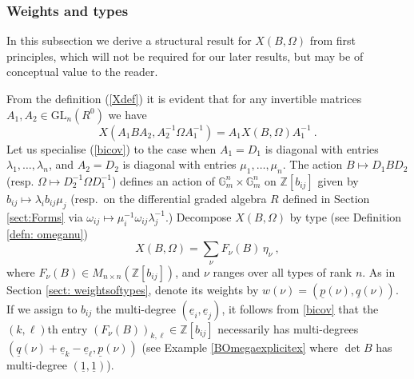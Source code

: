 \documentclass[10pt]{amsart}
\newcommand{\ZZ}{{\mathbb Z}}
\newcommand{\pp}{{\underline{p}}}
\newcommand{\qq}{{\underline{q}}}
\newcommand{\eee}{{\underline{e}}}
\newcommand{\one}{{\underline{1}}}
\theoremstyle{plain}
\newcommand{\0}{\color{blue}{\mathsf{0}}}
\begin{document}
\subsubsection{Weights and types}
In this subsection we derive a structural result for $X(B,\Omega)$ from first principles, which will not be required for our later results, but may be of conceptual value to the reader.

From the definition (\ref{Xdef}) it is evident that for any invertible matrices $A_1,A_2\in\mathrm{GL}_n(R^0)$ we have
\begin{equation}\label{bicov}
X(A_1BA_2,A_2^{-1}\Omega A_1^{-1})=A_1X(B,\Omega)A_1^{-1}\ .
\end{equation}
Let us specialise  (\ref{bicov}) to the case when $A_1=D_1$ is diagonal with entries  $\lambda_1,\ldots, \lambda_n$,  and $A_2=D_2$ is diagonal with entries $\mu_1,\ldots, \mu_n$.  
The action $B \mapsto D_1 B D_2$ (resp. $\Omega\mapsto D_2^{-1} \Omega D_1^{-1}$)  defines an action of $\mathbb{G}_m^n \times \mathbb{G}^n_m$ on $\ZZ[b_{ij}]$ given by $b_{ij} \mapsto  \lambda_i b_{ij} \mu_j$ (resp.\  on  the differential graded algebra $R$ defined in Section \ref{sect:Forms} via $\omega_{ij} \mapsto \mu_i^{-1} \omega_{ij} \lambda^{-1}_j$.)   Decompose $X(B,\Omega)$  by type (see Definition \ref{defn: omeganu})
\begin{equation} \label{Xdecomp}
X(B,\Omega) =  \sum_{\nu}  F_{\nu}(B)\,\eta_{\nu}\ ,
\end{equation}
where $F_{\nu}(B)\in M_{n\times n}(\ZZ[b_{ij}])$, and  $\nu$  ranges over all types of rank $n$.  As in Section \ref{sect: weightsoftypes}, denote its  weights    by $w(\nu) = (\pp(\nu), \qq(\nu)) $. 
If we assign to $b_{ij}$ the multi-degree $(\eee_i,\eee_j)$, it follows from \eqref{bicov}  that  the  $(k,\ell)$th entry $(F_{\nu}(B))_{k, \ell} \in \ZZ[b_{ij}]$    necessarily 
has multi-degrees $(\qq(\nu)+\eee_k-\eee_{\ell}, \pp(\nu))$   
(see Example \ref{BOmegaexplicitex} where $\det B$ has multi-degree $(\one,\one)$).
\end{document}
